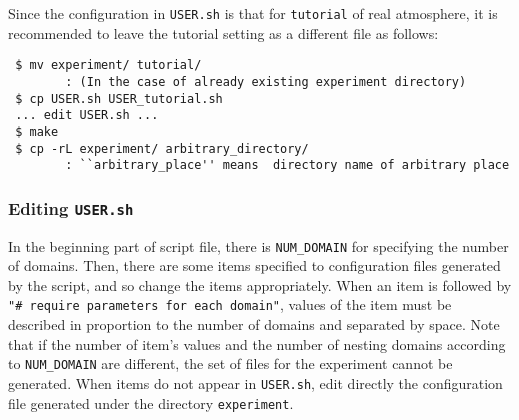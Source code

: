 Since the configuration in \verb|USER.sh| is that for \verb|tutorial| of real atmosphere,
it is recommended to leave the tutorial setting as a different file as follows: 
\begin{verbatim}
 $ mv experiment/ tutorial/    
        : (In the case of already existing experiment directory)
 $ cp USER.sh USER_tutorial.sh
 ... edit USER.sh ...
 $ make
 $ cp -rL experiment/ arbitrary_directory/
        : ``arbitrary_place'' means  directory name of arbitrary place
\end{verbatim}


\subsubsection{Editing \texttt{USER.sh}}

In the beginning part of script file, there is \verb|NUM_DOMAIN| for specifying the number of domains.
Then, there are some items specified to configuration files generated by the script,
and so change the items appropriately.
When an item is followed by \verb|"# require parameters for each domain"|,
values of the item must be described in proportion to the number of domains and separated by space. Note that if the number of item's values and the number of nesting domains according to \verb|NUM_DOMAIN| are different, the set of files for the experiment cannot be generated. When items do not appear in \verb|USER.sh|, edit directly the configuration file generated under the directory \verb|experiment|.
